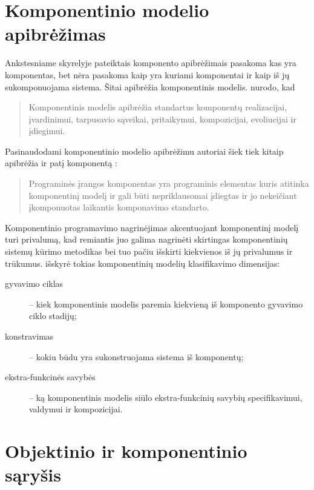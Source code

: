 \section{Komponentinio modelio apibrėžimas}

Ankstesniame skyrelyje pateiktais komponento apibrėžimais pasakoma kas
yra komponentas, bet nėra pasakoma kaip yra kuriami komponentai ir kaip
iš jų sukomponuojama sistema. Šitai apibrėžia komponentinis
modelis. \cite[37]{heineman2001component} nurodo, kad
\begin{quote}
  Komponentinis modelis apibrėžia standartus komponentų realizacijai,
  įvardinimui, tarpusavio sąveikai, pritaikymui, kompozicijai,
  evoliucijai ir įdiegimui.
\end{quote}
Pasinaudodami komponentinio modelio apibrėžimu autoriai šiek tiek
kitaip apibrėžia ir patį komponentą \cite[7]{heineman2001component}:
\begin{quote}
  Programinės įrangos komponentas yra programinis elementas kuris
  atitinka komponentinį modelį ir gali būti nepriklausomai įdiegtas
  ir jo nekeičiant įkomponuotas laikantis komponavimo standarto.
\end{quote}

Komponentinio programavimo nagrinėjimas akcentuojant komponentinį modelį
turi privalumą, kad remiantis juo galima nagrinėti skirtingas
komponentinių sistemų kūrimo metodikas bei tuo pačiu išskirti
kiekvienos iš jų privalumus ir trūkumus.
\cite[4]{classification-framework-for-scm} išskyrė tokias komponentinių
modelių klasifikavimo dimensijas:
\begin{description}
  \item[gyvavimo ciklas] – kiek komponentinis modelis paremia kiekvieną
    iš komponento gyvavimo ciklo stadijų;
  \item[konstravimas] – kokiu būdu yra sukonstruojama sistema iš
    komponentų;
  \item[ekstra-funkcinės savybės] – ką komponentinis modelis siūlo
    ekstra-funkcinių savybių specifikavimui, valdymui ir kompozicijai.
\end{description}

\section{Objektinio ir komponentinio sąryšis}

